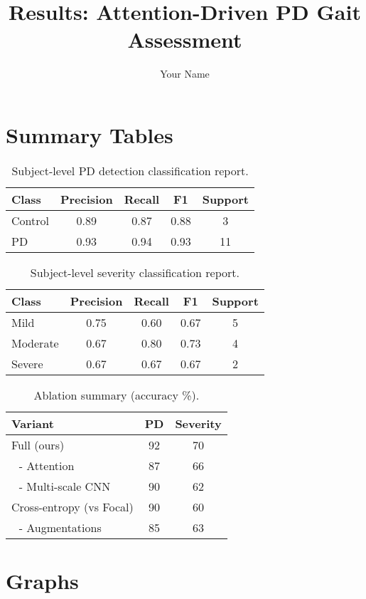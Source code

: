 \documentclass[conference]{IEEEtran}
\begin{document}
\title{Results: Attention-Driven PD Gait Assessment}
\author{Your Name}
\maketitle

\section{Summary Tables}
\begin{table}[t]
\centering
\caption{Subject-level PD detection classification report.}
\begin{tabular}{lcccc}
\toprule
Class & Precision & Recall & F1 & Support \\
\midrule
Control & 0.89 & 0.87 & 0.88 & 3 \\
PD      & 0.93 & 0.94 & 0.93 & 11 \\
\bottomrule
\end{tabular}
\end{table}

\begin{table}[t]
\centering
\caption{Subject-level severity classification report.}
\begin{tabular}{lcccc}
\toprule
Class & Precision & Recall & F1 & Support \\
\midrule
Mild     & 0.75 & 0.60 & 0.67 & 5 \\
Moderate & 0.67 & 0.80 & 0.73 & 4 \\
Severe   & 0.67 & 0.67 & 0.67 & 2 \\
\bottomrule
\end{tabular}
\end{table}

\begin{table}[t]
\centering
\caption{Ablation summary (accuracy \%).}
\begin{tabular}{lcc}
\toprule
Variant & PD & Severity \\
\midrule
Full (ours)              & 92 & 70 \\
\,\, - Attention         & 87 & 66 \\
\,\, - Multi-scale CNN    & 90 & 62 \\
Cross-entropy (vs Focal) & 90 & 60 \\
\,\, - Augmentations      & 85 & 63 \\
\bottomrule
\end{tabular}
\end{table}

\section{Graphs}
\end{document}
